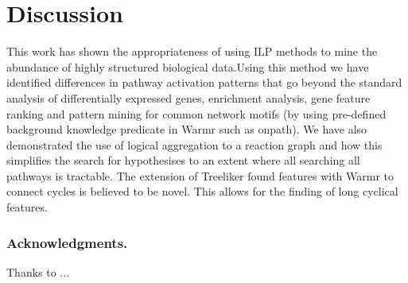 \documentclass[runningheads,a4paper]{llncs}
\begin{document}
\section{Discussion}
This work has shown the appropriateness of using ILP methods to mine the abundance of highly structured biological data.Using this method we have identified differences in pathway activation patterns that go beyond the standard analysis of differentially expressed genes, enrichment analysis, gene feature ranking and pattern mining for common network motifs (by using pre-defined background knowledge predicate in Warmr such as onpath). We have also demonstrated the use of logical aggregation to a  reaction graph and how this simplifies the search for hypothesises to an extent where all searching all pathways is tractable. The extension of Treeliker found features with Warmr to connect cycles is believed to be novel. This allows for the finding of long cyclical features.  



\subsubsection*{Acknowledgments.} Thanks to ...




{}
%

%
%
\end{document}
